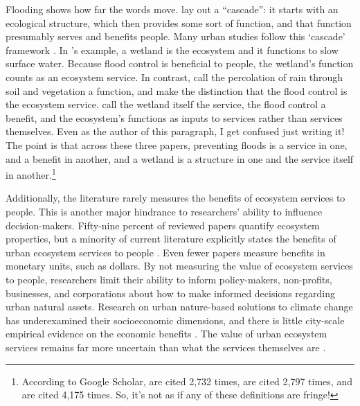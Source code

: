 \documentclass[12pt]{article}
\begin{document}
Flooding shows how far the words move. \citet{haines-youngLinksBiodiversityEcosystem2010} lay out a ``cascade'': it starts with an ecological structure, which then provides some sort of function, and that function presumably serves and benefits people. Many urban studies follow this `cascade' framework \citep{baro_mapping_2016, veerkampReviewStudiesAssessing2021}. In \citeauthor{haines-youngLinksBiodiversityEcosystem2010}'s \citeyearpar{haines-youngLinksBiodiversityEcosystem2010} example, a wetland is the ecosystem and it functions to slow surface water. Because flood control is beneficial to people, the wetland's function counts as an ecosystem service. In contrast, \citet{gomez-baggethunClassifyingValuingEcosystem2013} call the percolation of rain through soil and vegetation a function, and make the distinction that the flood control is the ecosystem service. \citet{boydWhatAreEcosystem2007} call the wetland itself the service, the flood control a benefit, and the ecosystem's functions as inputs to services rather than services themselves. Even as the author of this paragraph, I get confused just writing it! The point is that across these three papers, preventing floods is a service in one, and a benefit in another, and a wetland is a structure in one and the service itself in another.\footnote{According to Google Scholar, \citet{haines-youngLinksBiodiversityEcosystem2010} are cited 2,732 times, \citet{gomez-baggethunClassifyingValuingEcosystem2013} are cited 2,797 times, and \citet{boydWhatAreEcosystem2007} are cited 4,175 times. So, it's not as if any of these definitions are fringe!}    

Additionally, the literature rarely measures the benefits of ecosystem services to people. This is another major hindrance to researchers' ability to influence decision-makers. Fifty-nine percent of reviewed papers quantify ecosystem properties, but a minority of current literature explicitly states the benefits of urban ecosystem services to people \citep{veerkampReviewStudiesAssessing2021}. Even fewer papers measure benefits in monetary units, such as dollars. By not measuring the value of ecosystem services to people, researchers limit their ability to inform policy-makers, non-profits, businesses, and corporations about how to make informed decisions regarding urban natural assets. Research on urban nature-based solutions to climate change has underexamined their socioeconomic dimensions, and there is little city-scale empirical evidence on the economic benefits \citep{mcphearsonGlobalSynthesisRegional2025,herisPilotingUrbanEcosystem2021}. The value of urban ecosystem services remains far more uncertain than what the services themselves are \citep{keelerSocialecologicalTechnologicalFactors2019}.
\end{document}
